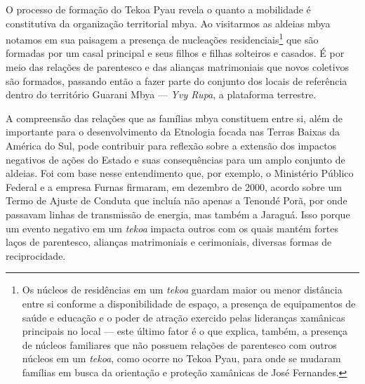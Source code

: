 O processo de formação do Tekoa Pyau revela o quanto a mobilidade é
constitutiva da organização territorial mbya. Ao visitarmos as aldeias
mbya notamos em sua paisagem a presença de nucleações
residenciais\footnote{Os núcleos de residências em um \emph{tekoa} guardam
maior ou menor distância entre si conforme a disponibilidade de espaço,
a presença de equipamentos de saúde e educação e o poder de atração
exercido pelas lideranças xamânicas principais no local --- este último
fator é o que explica, também, a presença de núcleos familiares que não
possuem relações de parentesco com outros núcleos em um \emph{tekoa}, como
ocorre no Tekoa Pyau, para onde se mudaram famílias em busca da
orientação e proteção xamânicas de José Fernandes.} que são formadas
por um casal principal e seus filhos e filhas solteiros e casados. É
por meio das relações de parentesco e das alianças matrimoniais que
novos coletivos são formados, passando então a fazer parte do conjunto
dos locais de referência dentro do território Guarani Mbya --- \emph{Yvy Rupa},
a plataforma terrestre.

A compreensão das relações que as famílias mbya constituem entre si,
além de importante para o desenvolvimento da Etnologia focada nas
Terras Baixas da América do Sul, pode contribuir para reflexão sobre a
extensão dos impactos negativos de ações do Estado e suas consequências
para um amplo conjunto de aldeias. Foi com base nesse entendimento que,
por exemplo, o Ministério Público Federal e a empresa Furnas firmaram,
em dezembro de 2000, acordo sobre um Termo de Ajuste de Conduta que
incluía não apenas a  Tenondé Porã, por onde passavam linhas de
transmissão de energia, mas também a  Jaraguá. Isso porque um evento
negativo em um \emph{tekoa} impacta outros com os quais mantém fortes laços de
parentesco, alianças matrimoniais e cerimoniais, diversas formas de
reciprocidade.

